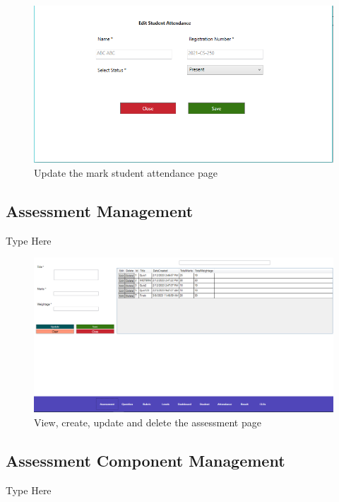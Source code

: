 \documentclass[12pt,a4paper]{article}
\begin{document}
\begin{figure}[H]
  \centering
  \includegraphics[scale=0.8]{GUIUpdateEditAttendance}

  \caption{Update the mark student attendance page}
\end{figure}


\subsection{Assessment Management}
Type Here

\begin{figure}[H]
  \centering
  \includegraphics[scale=0.5]{GUIAssessment}

  \caption{View, create, update and delete the assessment page}
\end{figure}

\subsection{Assessment Component Management}
Type Here
\end{document}
